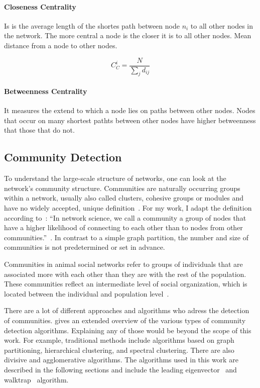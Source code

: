 \paragraph{Closeness Centrality}
Is is the average length of the shortes path between node $n_i$ to all other nodes in the network. The more central a node is the closer it is to all other nodes. Mean distance from a node to other nodes.~\cite{newman2010networks}

$$C_C^i=\frac{N}{\sum_{j}d_{ij}}$$

\paragraph{Betweenness Centrality}
It measures the extend to which a node lies on paths between other nodes. Nodes that occur on many shortest pathts between other nodes have higher betweenness that those that do not.


\subsection{Community Detection}
To understand the large-scale structure of networks, one can look at the network's community structure. Communities are naturally occurring groups within a network, usually also called clusters, cohesive groups or modules and have no widely accepted, unique definition~\cite{palla2005uncovering}.
For my work, I adapt the definition according to~\textcite{barabasi2016network}: 
``In network science, we call a community a group of nodes that have a higher likelihood of connecting to each other than to nodes from other communities.''~\cite[p.~TODO]{barabasi2016network}. In contrast to a simple graph partition, the number and size of communities is not predetermined or set in advance.

Communities in animal social networks refer to groups of individuals that are associated more with each other than they are with the rest of the population. These communities reflect an intermediate level of social organization, which is located between the individual and population level~\cite{croft2008exploring}.

There are a lot of different approaches and algorithms who adress the detection of communities. \textcite{fortunato2010community} gives an extended overview of the various types of community detection algorithms.
Explaining any of those would be beyond the scope of this work. For example, traditional methods include algorithms based on graph partitioning, hierarchical clustering, and spectral clustering. There are also divisive and agglomerative algorithms.
The algorithms used in this work are described in the following sections and include the leading eigenvector~\cite{newman2006finding} and walktrap~\cite{pons2005computing} algorithm.

